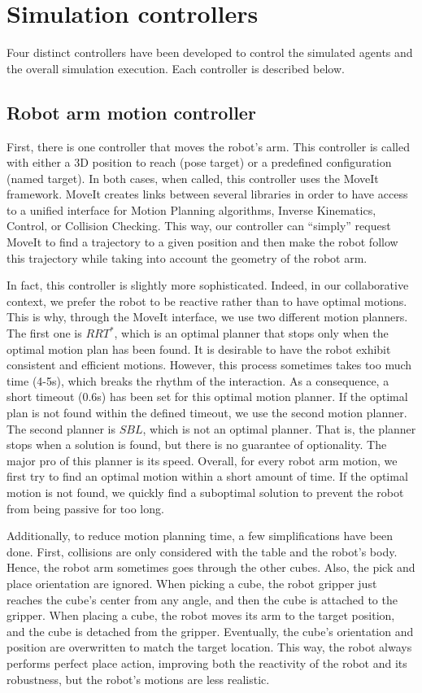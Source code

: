 \section{Simulation controllers}

Four distinct controllers have been developed to control the simulated agents and the overall simulation execution. Each controller is described below. 

\subsection{Robot arm motion controller}

First, there is one controller that moves the robot's arm. This controller is called with either a 3D position to reach (pose target) or a predefined configuration (named target). In both cases, when called, this controller uses the MoveIt framework. MoveIt creates links between several libraries in order to have access to a unified interface for Motion Planning algorithms, Inverse Kinematics, Control, or Collision Checking. This way, our controller can ``simply'' request MoveIt to find a trajectory to a given position and then make the robot follow this trajectory while taking into account the geometry of the robot arm.

In fact, this controller is slightly more sophisticated. Indeed, in our collaborative context, we prefer the robot to be reactive rather than to have optimal motions. This is why, through the MoveIt interface, we use two different motion planners. The first one is $RRT^*$, which is an optimal planner that stops only when the optimal motion plan has been found. It is desirable to have the robot exhibit consistent and efficient motions. However, this process sometimes takes too much time (4-5s), which breaks the rhythm of the interaction. As a consequence, a short timeout (0.6s) has been set for this optimal motion planner. If the optimal plan is not found within the defined timeout, we use the second motion planner. 
The second planner is $SBL$, which is not an optimal planner. That is, the planner stops when a solution is found, but there is no guarantee of optionality. The major pro of this planner is its speed.
Overall, for every robot arm motion, we first try to find an optimal motion within a short amount of time. If the optimal motion is not found, we quickly find a suboptimal solution to prevent the robot from being passive for too long.

Additionally, to reduce motion planning time, a few simplifications have been done. 
First, collisions are only considered with the table and the robot's body. Hence, the robot arm sometimes goes through the other cubes.
Also, the pick and place orientation are ignored. When picking a cube, the robot gripper just reaches the cube's center from any angle, and then the cube is attached to the gripper. When placing a cube, the robot moves its arm to the target position, and the cube is detached from the gripper. Eventually, the cube's orientation and position are overwritten to match the target location. This way, the robot always performs perfect place action, improving both the reactivity of the robot and its robustness, but the robot's motions are less realistic.

